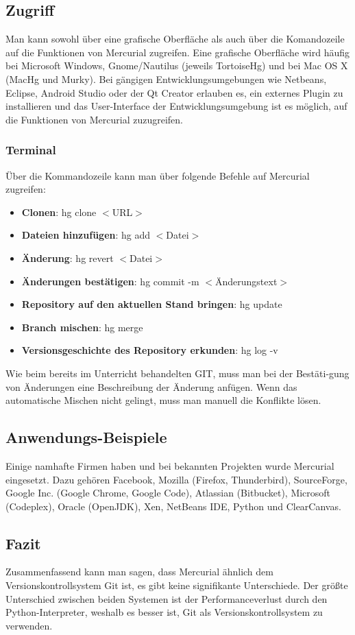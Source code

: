 \subsection{Zugriff}
Man kann sowohl über eine grafische Oberfläche als auch über die Komandozeile auf die Funktionen von Mercurial zugreifen. Eine grafische Oberfläche wird häufig bei Microsoft Windows, Gnome/Nautilus (jeweils TortoiseHg) und bei Mac OS X (MacHg und Murky). Bei gängigen Entwicklungsumgebungen wie Netbeans, Eclipse, Android Studio oder der Qt Creator erlauben es, ein externes Plugin zu installieren und das User-Interface der Entwicklungsumgebung ist es möglich, auf die Funktionen von Mercurial zuzugreifen.
\subsubsection{Terminal}
Über die Kommandozeile kann man über folgende Befehle auf Mercurial zugreifen:
\begin{itemize}
\item\textbf{Clonen}: hg clone \(<\)URL\(>\)
\item\textbf{Dateien hinzufügen}: hg add \(<\)Datei\(>\)
\item\textbf{Änderung}: hg revert \(<\)Datei\(>\)
\item\textbf{Änderungen bestätigen}: hg commit -m \(<\)Änderungstext\(>\)
\item\textbf{Repository auf den aktuellen Stand bringen}: hg update
\item\textbf{Branch mischen}: hg merge
\item\textbf{Versionsgeschichte des Repository erkunden}: hg log -v
\end{itemize}
Wie beim bereits im Unterricht behandelten GIT, muss man bei der Bestäti-gung von Änderungen eine Beschreibung der Änderung anfügen. Wenn das automatische Mischen nicht gelingt, muss man manuell die Konflikte lösen.
\subsection{Anwendungs-Beispiele}
Einige namhafte Firmen haben und bei bekannten Projekten wurde Mercurial eingesetzt. Dazu gehören Facebook, Mozilla (Firefox, Thunderbird), SourceForge, Google Inc. (Google Chrome, Google Code), Atlassian (Bitbucket), Microsoft (Codeplex), Oracle (OpenJDK), Xen, NetBeans IDE, Python und ClearCanvas.
\subsection{Fazit}
Zusammenfassend kann man sagen, dass Mercurial ähnlich dem Versionskontrollsystem Git ist, es gibt keine signifikante Unterschiede. Der größte Unterschied zwischen beiden Systemen ist der Performanceverlust durch den Python-Interpreter, weshalb es besser ist, Git als Versionskontrollsystem zu verwenden.
